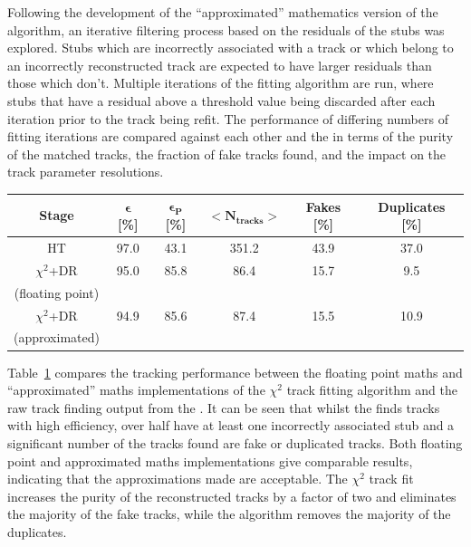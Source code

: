 Following the development of the ``approximated'' mathematics version of the algorithm, an iterative filtering process based on the residuals of the stubs was explored.
Stubs which are incorrectly associated with a track or which belong to an incorrectly reconstructed track are expected to have larger residuals than those which don't.
Multiple iterations of the fitting algorithm are run, where stubs that have a residual above a threshold value being discarded after each iteration prior to the track being refit.
The performance of differing numbers of fitting iterations are compared against each other and the \KF in terms of the purity of the matched tracks, the fraction of fake tracks found, and the impact on the track parameter resolutions.


\begin{table}[htbp]

\label{tab:chi2-exactVsApprox}
 \centering
 \begin{tabular}{cccccc}
   \hline
   \bf{Stage} & \bf{$\bm{\epsilon}$ [\%]} & \bf{$\bm{\epsilon_{P}}$ [\%]} & $\bm{<N_{tracks}>}$ & \bf{Fakes [\%]} & \bf{Duplicates [\%]}  \\
        \hline
   HT &  97.0 & 43.1 & 351.2 & 43.9 & 37.0 \\  
   \hline
   $\chi^{2}$+DR & 95.0 & 85.8 & 86.4 & 15.7 & 9.5 \\
   (floating point) & & & & & \\
   \hline
   $\chi^{2}$+DR & 94.9 & 85.6 & 87.4 & 15.5 & 10.9 \\  
   (approximated) & & & & & \\   
   \hline
   
 \end{tabular}%
\end{table}

Table~\ref{tab:chi2-exactVsApprox} compares the tracking performance between the floating point maths and ``approximated'' maths implementations of the $\chi^{2}$ track fitting algorithm and the raw track finding output from the \HT.
It can be seen that whilst the \HT finds tracks with high efficiency, over half have at least one incorrectly associated stub and a significant number of the tracks found are fake or duplicated tracks.
Both floating point and approximated maths implementations give comparable results, indicating that the approximations made are acceptable.
The $\chi^{2}$ track fit increases the purity of the reconstructed tracks by a factor of two and eliminates the majority of the fake tracks, while the \DR algorithm removes the majority of the duplicates.


